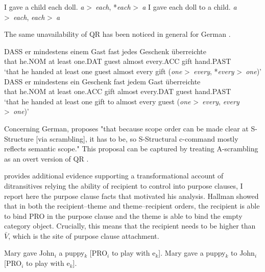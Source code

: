 \documentclass[11pt]{upenndiss}
\begin{document}
\begin{exe}
\ex \cite[ex 2]{Bruening.2001}
\begin{xlist}
\ex I gave a child each doll. \hfill \textit{a} \textgreater \  \textit{each}, *\textit{each} \textgreater \ \textit{a}
\ex I gave each doll to a child. \hfill \textit{a} \textgreater \  \textit{each}, \textit{each} \textgreater \ \textit{a}
\end{xlist}
\end{exe}
The same unavailability of QR has been noticed in general for German \citep{Frey.1993}. 
\begin{exe}
\ex \cite[exx 22 \& 21]{Frey.1993}
\begin{xlist}
	\ex \gll DASS er mindestens einem Gast fast jedes Geschenk \"{u}berreichte\\
	that he.NOM {at least} one.DAT guest almost every.ACC gift hand.PAST\\
	\trans `that he handed at least one guest almost every gift (\textit{one} \textgreater \ \textit{every}, *\textit{every} \textgreater \ \textit{one})'
	\ex \gll DASS er mindestens ein Geschenk fast jedem Gast \"{u}berreichte\\
	that he.NOM {at least} one.ACC gift almost every.DAT guest hand.PAST\\
	\trans `that he handed at least one gift to almost every guest (\textit{one} \textgreater \ \textit{every}, \textit{every} \textgreater \ \textit{one})'
\end{xlist}
\end{exe}

Concerning German, \cite[44]{Beck.1996} proposes "that because scope order can be made clear at S-Structure [via scrambling], it has to be, so S-Structural c-command mostly reflects semantic scope." This proposal can be captured by treating A-scrambling as an overt version of QR \citep{Tonoike.1997,Abe.2005,Miyagawa.2006}.

\cite{Hallman.2015} provides additional evidence supporting a transformational account of ditransitives relying the ability of recipient to control into purpose clauses, I report here the purpose clause facts that motivated his analysis. Hallman showed that in both the recipient--theme and theme--recipient orders, the recipient is able to bind PRO in the purpose clause and the theme is able to bind the empty category object. Crucially, this means that the recipient needs to be higher than $\bar{V}$, which is the site of purpose clause attachment.
\begin{exe}
\ex \cite[exx 6 \& 7]{Hallman.2015}
\begin{xlist}
\ex Mary gave John$_{i}$ a puppy$_{k}$ [PRO$_{i}$ to play with e$_{k}$].
\ex Mary gave a puppy$_{k}$ to John$_{i}$ [PRO$_{i}$ to play with e$_{k}$].
\end{xlist}
\end{exe}%
\end{document}
